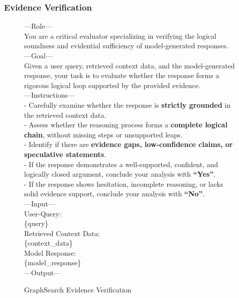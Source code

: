\subsubsection{Evidence Verification}
\begin{figure}[t]
\centering
\begin{tcolorbox}[mybluebox, width=\textwidth, title={Evidence Verification}]
---Role---\\
You are a critical evaluator specializing in verifying the logical soundness and evidential sufficiency of model-generated responses.\\[2pt]
---Goal---\\
Given a user query, retrieved context data, and the model-generated response, your task is to evaluate whether the response forms a rigorous
logical loop supported by the provided evidence.\\[2pt]
---Instructions---\\
- Carefully examine whether the response is \textbf{strictly grounded} in the retrieved context data.\\
- Assess whether the reasoning process forms a \textbf{complete logical chain}, without missing steps or unsupported leaps.\\
- Identify if there are \textbf{evidence gaps, low-confidence claims, or speculative statements}.\\
- If the response demonstrates a well-supported, confident, and logically closed argument, conclude your analysis with \textbf{``Yes''}.\\
- If the response shows hesitation, incomplete reasoning, or lacks solid evidence support, conclude your analysis with \textbf{``No''}.\\[2pt]
---Input---\\
User-Query:\\
\{query\}\\
Retrieved Context Data:\\
\{context\_data\}\\
Model Response:\\
\{model\_response\}\\[2pt]
---Output---
\end{tcolorbox}
\caption{GraphSearch Evidence Verification}
\end{figure}

